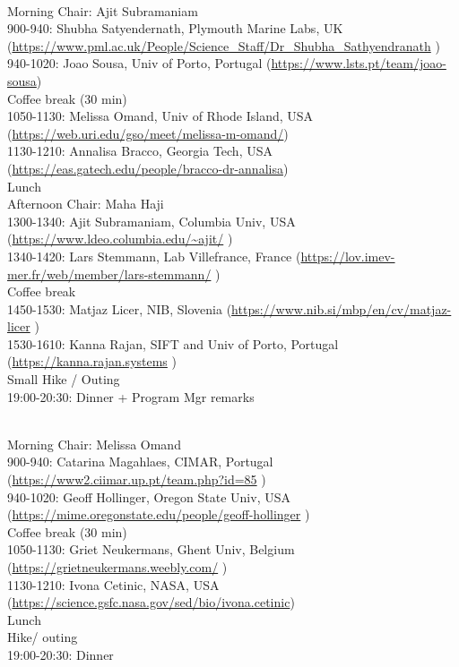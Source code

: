  \\
Morning Chair: Ajit Subramaniam \\
900-940: Shubha Satyendernath, Plymouth Marine Labs, UK (\url{https://www.pml.ac.uk/People/Science_Staff/Dr_Shubha_Sathyendranath} )\\
940-1020: Joao Sousa, Univ of Porto, Portugal (\url{https://www.lsts.pt/team/joao-sousa})\\
Coffee break (30 min)\\
1050-1130: Melissa Omand, Univ of Rhode Island, USA (\url{https://web.uri.edu/gso/meet/melissa-m-omand/})\\
1130-1210: Annalisa Bracco, Georgia Tech, USA (\url{https://eas.gatech.edu/people/bracco-dr-annalisa})\\
Lunch\\
Afternoon Chair: Maha Haji \\
1300-1340: Ajit Subramaniam, Columbia Univ, USA (\url{https://www.ldeo.columbia.edu/~ajit/} )\\
1340-1420: Lars Stemmann, Lab Villefrance, France (\url{https://lov.imev-mer.fr/web/member/lars-stemmann/} )\\
Coffee break \\
1450-1530: Matjaz Licer, NIB, Slovenia (\url{https://www.nib.si/mbp/en/cv/matjaz-licer} )\\
1530-1610: Kanna Rajan,  SIFT and  Univ of Porto, Portugal (\url{https://kanna.rajan.systems} )\\
Small Hike / Outing \\
19:00-20:30: Dinner  + Program Mgr remarks

\vspace{3mm}

 \\
Morning Chair: Melissa Omand \\
900-940: Catarina Magahlaes, CIMAR, Portugal (\url{https://www2.ciimar.up.pt/team.php?id=85} )\\
940-1020: Geoff Hollinger, Oregon State Univ, USA (\url{https://mime.oregonstate.edu/people/geoff-hollinger} )\\
Coffee break (30 min) \\
1050-1130: Griet Neukermans, Ghent Univ, Belgium (\url{https://grietneukermans.weebly.com/} )\\
1130-1210: Ivona Cetinic, NASA, USA (\url{https://science.gsfc.nasa.gov/sed/bio/ivona.cetinic})\\
Lunch \\
Hike/ outing \\
19:00-20:30: Dinner

